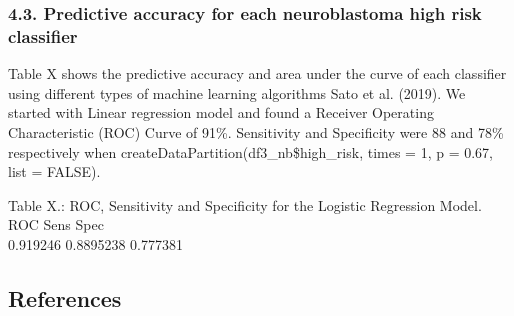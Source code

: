 \documentclass[
]{article}
\begin{document}
\hypertarget{predictive-accuracy-for-each-neuroblastoma-high-risk-classifier}{%
\subsubsection{4.3. Predictive accuracy for each neuroblastoma high risk
classifier}\label{predictive-accuracy-for-each-neuroblastoma-high-risk-classifier}}

Table X shows the predictive accuracy and area under the curve of each
classifier using different types of machine learning algorithms Sato et
al. (2019). We started with Linear regression model and found a Receiver
Operating Characteristic (ROC) Curve of 91\%. Sensitivity and
Specificity were 88 and 78\% respectively when
createDataPartition(df3\_nb\$high\_risk, times = 1, p = 0.67, list =
FALSE).

Table X.: ROC, Sensitivity and Specificity for the Logistic Regression
Model. ROC Sens Spec\\
0.919246 0.8895238 0.777381

\hypertarget{references}{%
\subsection{References}\label{references}}
\end{document}
